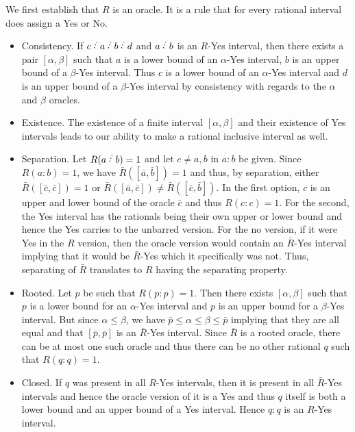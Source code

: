 \documentclass[12pt]{article}
\begin{document}
We first establish that $R$ is an oracle. It is a rule that for every rational interval does assign a Yes or No. 
\begin{itemize}
    \item Consistency. If $c\lte a \lte b \lte d$ and $a \lte b$ is an $R$-Yes interval, then there exists a pair $[\alpha, \beta]$ such that $a$ is a lower bound of an $\alpha$-Yes interval, $b$ is an upper bound of a $\beta$-Yes interval. Thus $c$ is a lower bound of an $\alpha$-Yes interval and $d$ is an upper bound of a $\beta$-Yes interval by consistency with regards to the $\alpha$ and $\beta$ oracles.
    \item Existence. The existence of a finite interval $[\alpha, \beta]$ and their existence of Yes intervals leads to our ability to make a rational inclusive interval as well. 
    \item Separation. Let $R(a\lte b) = 1$ and let $c \neq a, b$ in $a:b$ be given. Since $R(a:b)= 1$, we have $\bar{R}([\bar{a}, \bar{b}]) = 1$ and  thus, by separation, either $\bar{R}([\bar{c}, \bar{c}]) = 1$ or $\bar{R}([\bar{a}, \bar{c}]) \neq \bar{R}([\bar{c}, \bar{b}])$. In the first option, $c$ is an upper and lower bound of the oracle $\bar{c}$ and thus $R(c:c) =1$. For the second, the Yes interval has the rationals being their own upper or lower bound and hence the Yes carries to the unbarred version. For the no version, if it were Yes in the $R$ version, then the oracle version would contain an $\bar{R}$-Yes interval implying that it would be $\bar{R}$-Yes which it specifically was not. Thus, separating of $\bar{R}$ translates to $R$ having the separating property. 
    \item Rooted. Let $p$ be such that $R(p:p)=1$. Then there exists $[\alpha, \beta]$ such that $p$ is a lower bound for an $\alpha$-Yes interval and $p$ is an upper bound for a $\beta$-Yes interval. But since $\alpha \leq \beta$, we have $\bar{p} \leq \alpha \leq \beta \leq \bar{p}$ implying that they are all equal and that $[\bar{p}, \bar{p}]$ is an $\bar{R}$-Yes interval. Since $\bar{R}$ is a rooted oracle, there can be at most one such oracle and thus there can be no other rational $q$ such that $R(q:q) = 1$.
    \item Closed. If $q$ was present in all $R$-Yes intervals, then it is present in all $\bar{R}$-Yes intervals and hence the oracle version of it is a Yes and thus $q$ itself is both a lower bound and an upper bound of a Yes interval. Hence $q:q$ is an $R$-Yes interval.
\end{itemize}
\end{document}
